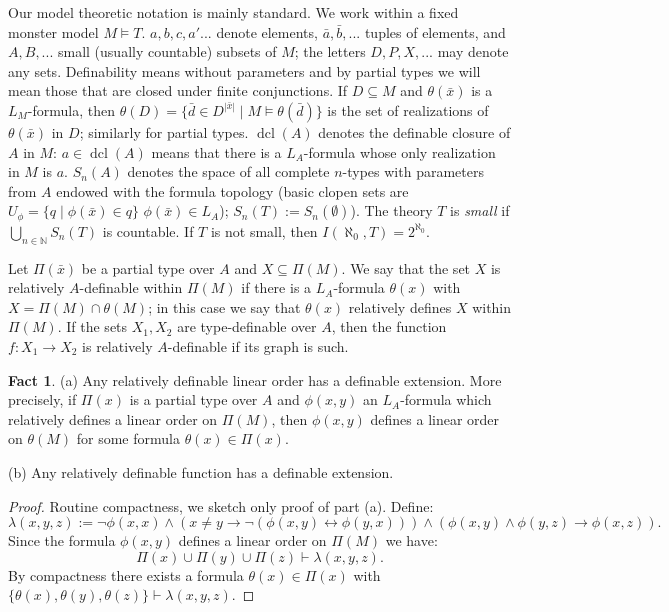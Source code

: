 \documentclass[10pt,a4paper]{amsart}
\theoremstyle{definition}
\newtheorem{Fact}[Theorem]{Fact}
\DeclareMathOperator{\dcl}{dcl}
\begin{document}
Our model theoretic notation is mainly standard. 
We work within a fixed  monster model $M\models T$.  $a,b,c,a'...$ denote elements,  $\bar a,\bar b,...$ tuples of elements, and $A,B,...$ small (usually countable)  subsets of $M$; the letters $D,P,X,...$ may denote  any sets. Definability means without parameters and by partial types we will mean those that are closed under finite conjunctions. If $D\subseteq M$ and $\theta(\bar x)$ is a $L_M$-formula,  then  
 $\theta(D)=\{\bar d\in D^{|\bar x|}\mid M\models \theta(\bar d)\}$ is the set of realizations of  $\theta(\bar x)$ in $D$; similarly for partial  types. $\dcl(A)$ denotes the definable closure of $A$ in $M$: $a\in\dcl(A)$ means that there is a $L_A$-formula whose only realization in $M$ is $a$.  
$S_n(A)$ denotes the space of all complete $n$-types with parameters from $A$ endowed with the formula topology (basic clopen sets are $U_{\phi}=\{q\mid \phi(\bar x)\in q\}$ $\phi(\bar x)\in L_A$); 
$S_n(T):=S_n(\emptyset)$). The theory $T$ is {\it small} if   $\bigcup_{n\in\mathbb N}S_n(T)$ is countable. If $T$ is not small,  then  $I(\aleph_0,T)=2^{\aleph_0}$. 

Let $\Pi(\bar x)$ be a partial type over $A$ and $X\subseteq \Pi(M)$. We say that the set $X$ is relatively $A$-definable within $\Pi(M)$ if there is a $L_A$-formula $\theta(x)$ with $X=\Pi(M)\cap \theta(M)$; in this case we say that $\theta(x)$ relatively defines $X$ within $\Pi(M)$. 
If the sets $X_1,X_2$ are type-definable over $A$, then the function $f: X_1\to X_2$  is relatively $A$-definable if its graph is such.


\begin{Fact}\label{Fact1}
(a) Any relatively definable linear order has a definable extension. More precisely, if $\Pi(x)$ is a partial type over $A$ and $\phi(x,y)$  an  $L_A$-formula which relatively defines a linear order on $\Pi(M)$, then $\phi(x,y)$ defines a linear order on $\theta(M)$ for some  formula $\theta(x)\in \Pi(x)$. 


(b)  Any relatively definable function has a definable extension. 
\end{Fact}
\begin{proof}
Routine compactness, we sketch only proof of part (a). Define:
$$\lambda(x,y,z):=\lnot\phi(x,x)\land (x\neq y\rightarrow \lnot(\phi(x,y)\leftrightarrow\phi(y,x)))\land (\phi(x,y)\land\phi(y,z)\rightarrow\phi(x,z)).$$
Since the formula $\phi(x,y)$ defines a linear order on $\Pi(M)$ we have:
$$\Pi(x)\cup\Pi(y)\cup\Pi(z)\vdash \lambda(x,y,z) .$$
By compactness there exists a formula $\theta(x)\in \Pi(x)$ with  $ \{\theta(x),\theta(y),\theta(z)\}\vdash\lambda(x,y,z)$.  
\end{proof}
\end{document}

